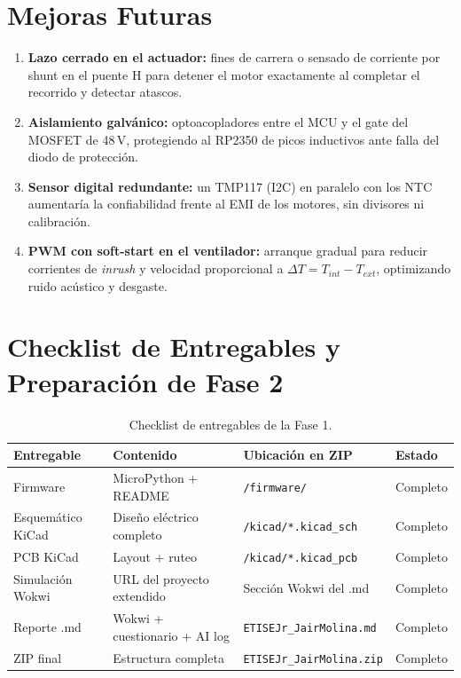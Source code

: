 \documentclass[11pt,letterpaper]{article}
\begin{document}
\section{Mejoras Futuras}
\begin{enumerate}
  \item \textbf{Lazo cerrado en el actuador:} fines de carrera o sensado de corriente por shunt en el puente H para detener el motor exactamente al completar el recorrido y detectar atascos.
  \item \textbf{Aislamiento galvánico:} optoacopladores entre el MCU y el gate del MOSFET de 48\,V, protegiendo al RP2350 de picos inductivos ante falla del diodo de protección.
  \item \textbf{Sensor digital redundante:} un TMP117 (I2C) en paralelo con los NTC aumentaría la confiabilidad frente al EMI de los motores, sin divisores ni calibración.
  \item \textbf{PWM con soft-start en el ventilador:} arranque gradual para reducir corrientes de \emph{inrush} y velocidad proporcional a $\Delta T = T_{int}-T_{ext}$, optimizando ruido acústico y desgaste.
\end{enumerate}

\section{Checklist de Entregables y Preparación de Fase 2}

\begin{table}[H]
\centering\small
{}
\begin{tabular}{l l l l}
\toprule
\rowcolor{JagDark}\color{white}\textbf{Entregable} & \color{white}\textbf{Contenido} & \color{white}\textbf{Ubicación en ZIP} & \color{white}\textbf{Estado} \\
\midrule
Firmware & MicroPython + README & \texttt{/firmware/} & Completo \\
Esquemático KiCad & Diseño eléctrico completo & \texttt{/kicad/*.kicad\_sch} & Completo \\
PCB KiCad & Layout + ruteo & \texttt{/kicad/*.kicad\_pcb} & Completo \\
Simulación Wokwi & URL del proyecto extendido & Sección Wokwi del .md & Completo \\
Reporte .md & Wokwi + cuestionario + AI log & \texttt{ETISEJr\_JairMolina.md} & Completo \\
ZIP final & Estructura completa & \texttt{ETISEJr\_JairMolina.zip} & Completo \\
\bottomrule
\end{tabular}
\caption{Checklist de entregables de la Fase 1.}
\end{table}
\end{document}
